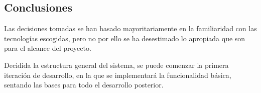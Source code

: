         \subsection{Conclusiones}

        Las decisiones tomadas se han basado mayoritariamente en la familiaridad con las tecnologías escogidas, pero no por ello se ha desestimado lo apropiada que son para el alcance del proyecto.
        
        Decidida la estructura general del sistema, se puede comenzar la primera iteración de desarrollo, en la que se implementará la funcionalidad básica, sentando las bases para todo el desarrollo posterior.